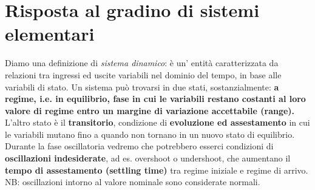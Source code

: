 \chapter{Risposta al gradino di sistemi elementari}
\begin{prop}
Diamo una definizione di \textit{sistema dinamico}: è un' entità caratterizzata da relazioni tra ingressi ed uscite variabili nel dominio del tempo, in base alle variabili di stato. Un sistema può trovarsi in due stati, sostanzialmente: \textbf{a regime, i.e. in equilibrio, fase in cui le variabili restano costanti al loro valore di regime entro un margine di variazione accettabile (range).} L'altro stato è il \textbf{transitorio}, condizione di \textbf{evoluzione ed assestamento} in cui le variabili mutano fino a quando non tornano in un nuovo stato di equilibrio. Durante la fase oscillatoria vedremo che potrebbero esserci condizioni di \textbf{oscillazioni indesiderate}, ad es. overshoot o undershoot, che aumentano il \textbf{tempo di assestamento (settling time)} tra regime iniziale e regime di arrivo. NB: oscillazioni intorno al valore nominale sono considerate normali.
\end{prop}

